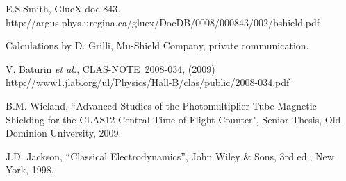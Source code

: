 \documentclass[12pt]{article}
\begin{document}
\begin{thebibliography}{99}
E.S.Smith, GlueX-doc-843.\\
http://argus.phys.uregina.ca/gluex/DocDB/0008/000843/002/bshield.pdf

Calculations by D. Grilli, Mu-Shield Company, private communication.

V. Baturin {\it et al.}, %
CLAS-NOTE~2008-034, (2009)\\
http://www1.jlab.org/ul/Physics/Hall-B/clas/public/2008-034.pdf

B.M. Wieland, ``Advanced Studies of the Photomultiplier Tube Magnetic 
Shielding for the CLAS12 Central Time of Flight Counter", Senior Thesis,
Old Dominion University, 2009.

J.D. Jackson, ``Classical Electrodynamics'', John Wiley \& Sons, 3rd ed., New York, 1998. 

\end{thebibliography}
\end{document}
